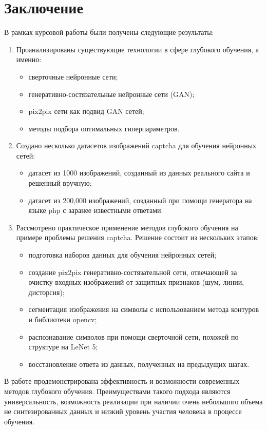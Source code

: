 \section*{Заключение}
В рамках курсовой работы были получены следующие результаты:

\begin{enumerate}[1)]
	\item  Проанализированы существующие технологии в сфере глубокого обучения, а именно:
	\begin{itemize}
		\item сверточные нейронные сети;
		\item генеративно-состязательные нейронные сети (GAN);
		\item pix2pix сети как подвид GAN сетей;
		\item методы подбора оптимальных гиперпараметров.
	\end{itemize}
	\item Создано несколько датасетов изображений captcha для обучения нейронных сетей:
	\begin{itemize}
		\item датасет из 1000 изображений, созданный из данных реального сайта и решенный вручную;
		\item датасет из 200,000 изображений, созданный при помощи генератора на языке php с заранее известными ответами.
	\end{itemize}
	\item Рассмотрено практическое применение методов глубокого обучения на примере проблемы решения captcha. Решение состоит из нескольких этапов:
	\begin{itemize}
		\item подготовка наборов данных для обучения нейронных сетей;
		\item создание pix2pix генеративно-состязательной сети, отвечающей за очистку входных изображений от защитных признаков (шум, линии, дисторсия);
		\item сегментация изображения на символы с использованием метода контуров и библиотеки opencv;
		\item распознавание символов при помощи сверточной сети, похожей по структуре на LeNet 5;
		\item восстановление ответа из данных, полученных на предыдущих шагах.
	\end{itemize}
\end{enumerate}

В работе продемонстрирована эффективность и возможности современных методов глубокого обучения. Преимуществами такого подхода являются универсальность, возможность реализации при наличии очень небольшого объема не синтезированных данных и низкий уровень участия человека в процессе обучения.

